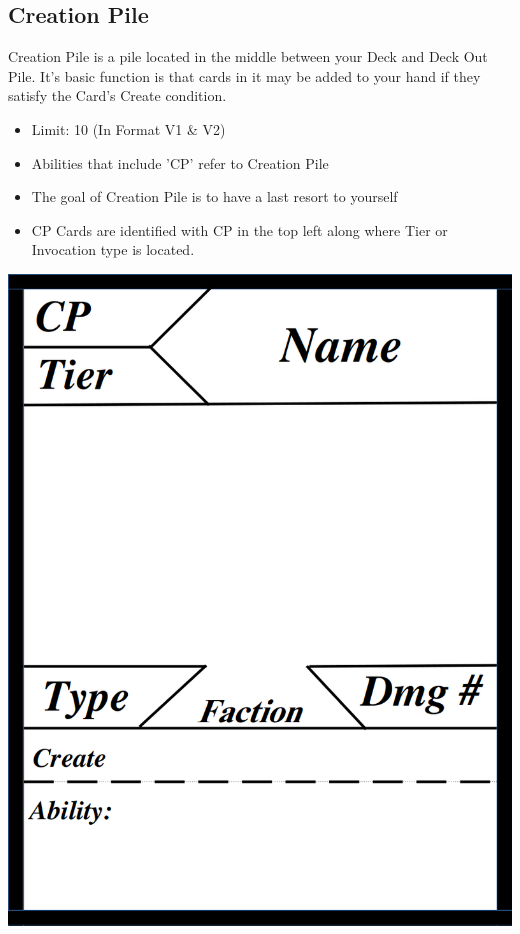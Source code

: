 \subsection{Creation Pile}
Creation Pile is a pile located in the middle between your Deck and Deck Out Pile. It's basic function is that 
cards in it may be added to your hand if they satisfy the Card's Create condition. 

\begin{itemize}
    \item Limit: 10 (In Format V1 \& V2)
    \item Abilities that include 'CP' refer to Creation Pile
    \item The goal of Creation Pile is to have a last resort to yourself
    \item CP Cards are identified with CP in the top left along where Tier or Invocation type is located. 
\end{itemize}

\begin{center}
    \includegraphics[scale = 0.25]{images/CPCardTemplate.png}
\end{center}